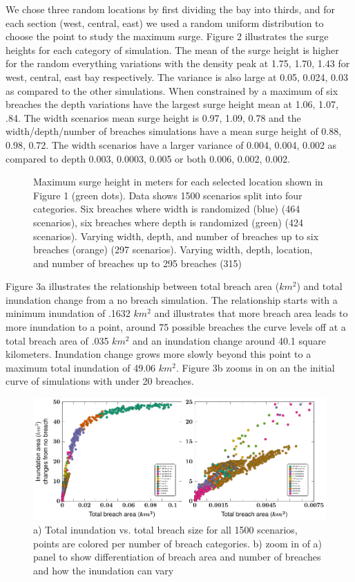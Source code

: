 \documentclass{coastal_paper}
\begin{document}
We chose three random locations by first dividing the bay into thirds, and for each section (west, central, east) we used a random uniform distribution to choose the point to study the maximum surge. Figure 2 illustrates the surge heights for each category of simulation. The mean of the surge height is higher for the random everything variations with the density peak at 1.75, 1.70, 1.43 for west, central, east bay respectively. The variance is also large at 0.05, 0.024, 0.03 as compared to the other simulations. When constrained by a maximum of six breaches the depth variations have the largest surge height mean at 1.06, 1.07, .84. The width scenarios mean surge height is 0.97, 1.09, 0.78 and the width/depth/number of breaches simulations have a mean surge height of 0.88, 0.98, 0.72. The width scenarios have a larger variance of 0.004, 0.004, 0.002 as compared to depth 0.003, 0.0003, 0.005 or both 0.006, 0.002, 0.002. 

\begin{figure}[ht]
    \centering
    \resizebox{\textwidth}{!}{%
            
        }
    \caption{Maximum surge height in meters for each selected location shown in Figure 1 (green dots). Data shows 1500 scenarios split into four categories. Six breaches where width is randomized (blue) (464 scenarios), six breaches where depth is randomized (green) (424 scenarios). Varying width, depth, and number of breaches up to six breaches (orange) (297 scenarios). Varying width, depth, location, and number of breaches up to 295 breaches (315)}
    \label{fig:2}
\end{figure}

Figure 3a illustrates the relationship between total breach area ($km^2$) and total inundation change from a no breach simulation. The relationship starts with a minimum inundation of .1632 $km^2$ and illustrates that more breach area leads to more inundation to a point, around 75 possible breaches the curve levels off at a total breach area of .035 $km^2$ and an inundation change around 40.1 square kilometers. Inundation change grows more slowly beyond this point to a maximum total inundation of 49.06 $km^2$. Figure 3b zooms in on an the initial curve of simulations with under 20 breaches.  

\begin{figure}[ht]
    \centering
    \includegraphics[width=\textwidth]{figures/fig3.pdf}
    \caption{a) Total inundation vs. total breach size for all 1500 scenarios, points are colored per number of breach categories. b) zoom in of a) panel to show differentiation of breach area and number of breaches and how the inundation can vary}
    \label{fig:3}
\end{figure}
\end{document}
